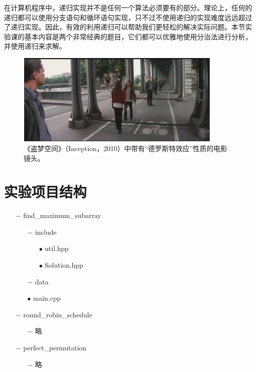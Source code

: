 \documentclass[12pt,a4paper]{article}
\begin{document}
在计算机程序中，递归实现并不是任何一个算法必须要有的部分。理论上，任何的递归都可以使用分支语句和循环语句实现，只不过不使用递归的实现难度远远超过了递归实现。因此，有效的利用递归可以帮助我们更轻松的解决实际问题。本节实验课的基本内容是两个非常经典的题目，它们都可以优雅地使用分治法进行分析，并使用递归来求解。


\begin{figure}
    \centering
    \includegraphics[width=10cm]{img/lab2/drosteeffect.png}
    \caption{《盗梦空间》（Inception，2010）中带有“德罗斯特效应”性质的电影镜头。}
    \label{fig:my_label}
\end{figure}


\section{实验项目结构}

\begin{itemize}[noitemsep]
    \item[$-$] find\_maximum\_subarray
        \begin{itemize}[noitemsep]
            \item[$-$] include
                \begin{itemize}[noitemsep]
                    \item[$\bullet$] util.hpp
                    \item[$\bullet$] Solution.hpp
                \end{itemize}
            \item[$-$] data
            \item[$\bullet$] main.cpp
        \end{itemize}
    \item[$-$] round\_robin\_schedule
        \begin{itemize}[noitemsep]
            \item[$-$] 略
        \end{itemize}
    \item[$-$] perfect\_permutation
        \begin{itemize}
            \item[$-$] 略
        \end{itemize}
\end{itemize}
\end{document}
